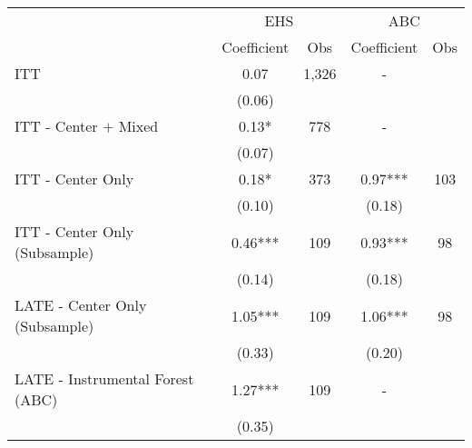 \begin{tabular}{lcccc}
\toprule 
\midrule 
 & \multicolumn{2}{c}{EHS} & \multicolumn{2}{c}{ABC} \\
 \cmidrule(lr){2-3} \cmidrule(lr){4-5} 
 & Coefficient & Obs & Coefficient & Obs \\
\midrule 
ITT & 0.07 & 1,326 & - \\
 & (0.06) &  \\
ITT - Center $+$ Mixed & 0.13* & 778 & - \\
 & (0.07) &  \\
ITT - Center Only & 0.18* & 373 & 0.97*** & 103 \\
 & (0.10) &  & (0.18) &  \\
ITT - Center Only (Subsample) & 0.46*** & 109 & 0.93*** & 98 \\
 & (0.14) &  & (0.18) &  \\
LATE - Center Only (Subsample) & 1.05*** & 109 & 1.06*** & 98 \\
 & (0.33) &  & (0.20) &  \\
LATE - Instrumental Forest (ABC) & 1.27*** & 109 & - \\
 & (0.35) &  \\
\midrule 
\bottomrule 
\end{tabular}
